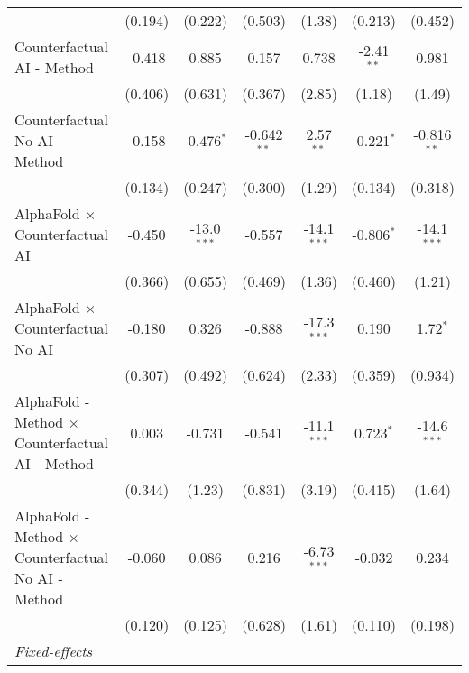 \begin{tabular}{lcccccc}
                                                              & (0.194)       & (0.222)       & (0.503)       & (1.38)        & (0.213)      & (0.452)\\   
   Counterfactual AI - Method                                 & -0.418        & 0.885         & 0.157         & 0.738         & -2.41$^{**}$ & 0.981\\   
                                                              & (0.406)       & (0.631)       & (0.367)       & (2.85)        & (1.18)       & (1.49)\\   
   Counterfactual No AI - Method                              & -0.158        & -0.476$^{*}$  & -0.642$^{**}$ & 2.57$^{**}$   & -0.221$^{*}$ & -0.816$^{**}$\\   
                                                              & (0.134)       & (0.247)       & (0.300)       & (1.29)        & (0.134)      & (0.318)\\   
   AlphaFold $\times$ Counterfactual AI                       & -0.450        & -13.0$^{***}$ & -0.557        & -14.1$^{***}$ & -0.806$^{*}$ & -14.1$^{***}$\\   
                                                              & (0.366)       & (0.655)       & (0.469)       & (1.36)        & (0.460)      & (1.21)\\   
   AlphaFold $\times$ Counterfactual No AI                    & -0.180        & 0.326         & -0.888        & -17.3$^{***}$ & 0.190        & 1.72$^{*}$\\   
                                                              & (0.307)       & (0.492)       & (0.624)       & (2.33)        & (0.359)      & (0.934)\\   
   AlphaFold - Method $\times$ Counterfactual AI - Method     & 0.003         & -0.731        & -0.541        & -11.1$^{***}$ & 0.723$^{*}$  & -14.6$^{***}$\\   
                                                              & (0.344)       & (1.23)        & (0.831)       & (3.19)        & (0.415)      & (1.64)\\   
   AlphaFold - Method $\times$ Counterfactual No AI - Method  & -0.060        & 0.086         & 0.216         & -6.73$^{***}$ & -0.032       & 0.234\\   
                                                              & (0.120)       & (0.125)       & (0.628)       & (1.61)        & (0.110)      & (0.198)\\   
   \midrule
   \emph{Fixed-effects}\\

\end{tabular}
